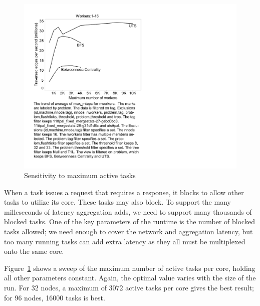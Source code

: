 \begin{figure}[htb]
\begin{center}
  \includegraphics[width=0.95\columnwidth]{figs/worker_sweep}
\begin{minipage}{0.95\columnwidth} 
  \caption{\label{fig:bfs-sweep-workers} Sensitivity to maximum active tasks}
\end{minipage}
\vspace{-3ex}
\end{center}
\end{figure}

When a task issues a request that requires a response, it blocks to
allow other tasks to utilize its core. These tasks may also block. To
support the many milleseconds of latency aggregation adds, we need to
support many thousands of blocked tasks. One of the key parameters of
the runtime is the number of blocked tasks allowed; we need enough to
cover the network and aggregation latency, but too many running tasks
can add extra latency as they all must be multiplexed onto the same core.

Figure~\ref{fig:bfs-sweep-workers} shows a sweep of the maximum number
of active tasks per core, holding all other parameters
constant. Again, the optimal value varies with the size of the
run. For 32 nodes, a maximum of 3072 active tasks per core gives the
best result; for 96 nodes, 16000 tasks is best. 

